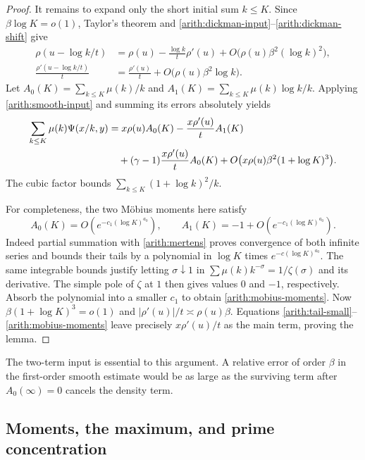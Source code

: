 \begin{proof}
It remains to expand only the short initial sum $k\le K$.
Since $\beta\log K=o(1)$, Taylor's theorem and
\eqref{arith:dickman-input}--\eqref{arith:dickman-shift} give
\begin{align*}
 \rho(u-\log k/t)&=\rho(u)-\frac{\log k}{t}\rho'(u)
       +O\bigl(\rho(u)\beta^2(\log k)^2\bigr),\\
 \frac{\rho'(u-\log k/t)}t&=\frac{\rho'(u)}t
       +O\bigl(\rho(u)\beta^2\log k\bigr).
\end{align*}
Let
$A_0(K)=\sum_{k\le K}\mu(k)/k$ and
$A_1(K)=\sum_{k\le K}\mu(k)\log k/k$.
Applying \eqref{arith:smooth-input} and summing its errors absolutely yields
\begin{align}\label{arith:short-expansion}
 \sum_{k\le K}\mu(k)\Psi(x/k,y)
 &=x\rho(u)A_0(K)-\frac{x\rho'(u)}t A_1(K)\notag\\
 &\quad +(\gamma-1)\frac{x\rho'(u)}t A_0(K)
 +O\bigl(x\rho(u)\beta^2(1+\log K)^3\bigr).
\end{align}
The cubic factor bounds $\sum_{k\le K}(1+\log k)^2/k$.

For completeness, the two M\"obius moments here satisfy
\begin{equation}\label{arith:mobius-moments}
 A_0(K)=O(e^{-c_1(\log K)^{a_0}}),\qquad
 A_1(K)=-1+O(e^{-c_1(\log K)^{a_0}}).
\end{equation}
Indeed partial summation with \eqref{arith:mertens} proves convergence
of both infinite series and bounds their tails by a polynomial in
$\log K$ times $e^{-c(\log K)^{a_0}}$.
The same integrable bounds justify letting $\sigma\downarrow1$ in
$\sum\mu(k)k^{-\sigma}=1/\zeta(\sigma)$ and its derivative.
The simple pole of $\zeta$ at $1$ then gives values $0$ and $-1$,
respectively. Absorb the polynomial into a smaller $c_1$ to obtain
\eqref{arith:mobius-moments}.
Now $\beta(1+\log K)^3=o(1)$ and
$|\rho'(u)|/t\asymp\rho(u)\beta$.
Equations \eqref{arith:tail-small}--\eqref{arith:mobius-moments}
leave precisely $x\rho'(u)/t$ as the main term, proving the lemma.
\end{proof}

The two-term input is essential to this argument. A relative error of order
$\beta$ in the first-order smooth estimate would be as large as the surviving
term after $A_0(\infty)=0$ cancels the density term.

\subsection{Moments, the maximum, and prime concentration}

